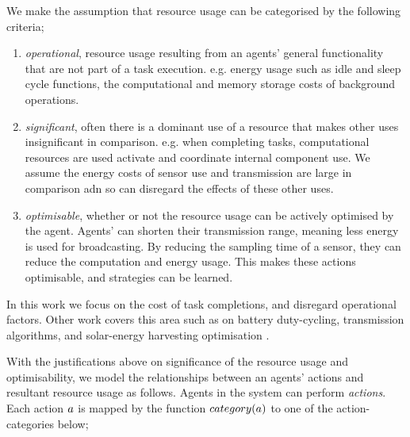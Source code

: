 We make the assumption that resource usage can be categorised by the following criteria;
\begin{enumerate}
	\item \textit{operational}, resource usage resulting from an agents' general functionality that are not part of a task execution. e.g. energy usage such as idle and sleep cycle functions, the computational and memory storage costs of background operations. 
	
	\item \textit{significant}, often there is a dominant use of a resource that makes other uses insignificant in comparison. e.g. when completing tasks, computational resources are used activate and coordinate internal component use. We assume the energy costs of sensor use and transmission are large in comparison adn so can disregard the effects of these other uses.
	
	\item \textit{optimisable}, whether or not the resource usage can be actively optimised by the agent. Agents' can shorten their transmission range, meaning less energy is used for broadcasting. By reducing the sampling time of a sensor, they can reduce the computation and energy usage. This makes these actions optimisable, and strategies can be learned.
\end{enumerate} 

In this work we focus on the cost of task completions, and disregard operational factors. Other work covers this area such as on battery duty-cycling, transmission algorithms, and solar-energy harvesting optimisation \citep{Kumar2010,Pinto2012,Matin2012,Escolar2014, Sharma2018}. 

With the justifications above on significance of the resource usage and optimisability, we model the relationships between an agents' actions and resultant resource usage as follows. Agents in the system can perform \textit{actions}. Each action $\varAction{}{}$ is mapped by the function $\functionAgentActionType{}{}$ to one of the action-categories below;

